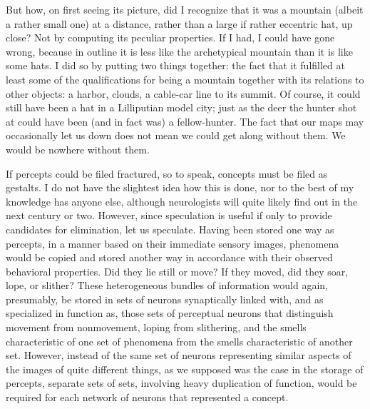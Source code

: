 But how, on first seeing its picture, did I recognize that it was a mountain (albeit a rather small one) at a distance, rather than a large if rather eccentric hat, up close? Not by computing its peculiar properties. If I had, I could have gone wrong, because in outline it is less like the archetypical mountain than it is like some hats. I did so by putting two things together: the fact that it fulfilled at least some of the qualifications for being a mountain together with its relations to other objects: a harbor, clouds, a cable-car line to its summit. Of course, it could still have been a hat in a Lilliputian model city; just as the deer the hunter shot at could have been (and in fact was) a
fellow-hunter. The fact that our maps may occasionally let us down does not mean we could get along without them. We would be nowhere without them.

If percepts could be filed fractured, so to speak, concepts must be filed as gestalts. I do not have the slightest idea how this is done, nor to the best of my knowledge has anyone else, although neurologists will quite likely find out in the next century or two. However, since speculation is useful if only to provide candidates for elimination, let us speculate. Having been stored one way as percepts, in a manner based on their immediate sensory images, phenomena would be copied and stored another way in accordance with their observed behavioral properties. Did they lie still or move? If they moved, did they soar, lope, or slither? These heterogeneous bundles of information would again, presumably, be stored in sets of neurons synaptically linked with, and as specialized in function as, those sets of perceptual neurons that distinguish movement from nonmovement, loping from slithering, and the smells characteristic of one set of phenomena from the smells characteristic of another set. However, instead of the same set of neurons representing similar aspects of the images of quite different things, as we supposed was the case in the storage of percepts, separate sets of sets, involving heavy duplication of function, would be required for each network of neurons that represented a concept.

